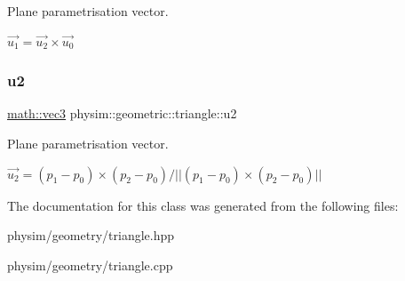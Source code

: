 Plane parametrisation vector. 

$ \vec{u_1} = \vec{u_2} \times \vec{u_0} $ \mbox{\label{classphysim_1_1geometric_1_1triangle_a6b87ae44a5f773a727d77a965ca9d695}} 
\subsubsection{\texorpdfstring{u2}{u2}}
{\footnotesize\ttfamily \hyperlink{structphysim_1_1math_1_1vec3}{math\+::vec3} physim\+::geometric\+::triangle\+::u2\hspace{0.3cm}{\ttfamily [private]}}



Plane parametrisation vector. 

$ \vec{u_2} = (p_1-p_0)\times(p_2-p_0)/ || (p_1-p_0)\times(p_2-p_0) || $ 

The documentation for this class was generated from the following files\+:\begin{DoxyCompactItemize}
\item 
physim/geometry/triangle.\+hpp\item 
physim/geometry/triangle.\+cpp\end{DoxyCompactItemize}
